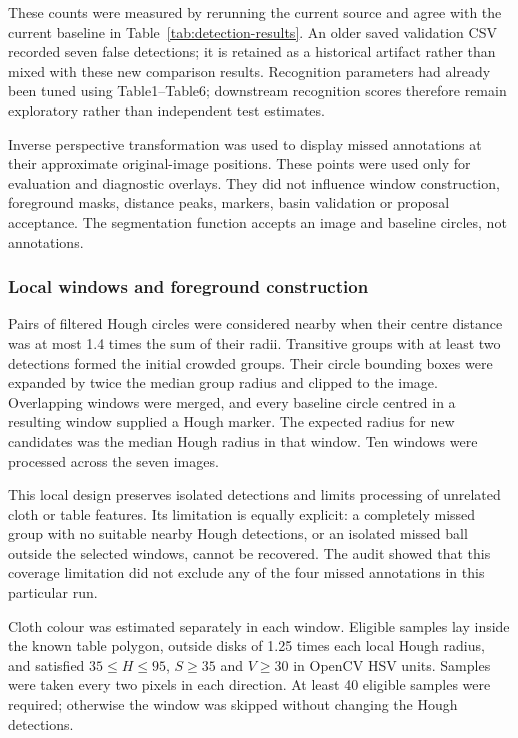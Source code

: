 These counts were measured by rerunning the current source and agree with
the current baseline in Table~\ref{tab:detection-results}. An older saved
validation CSV recorded seven false detections; it is retained as a historical
artifact rather than mixed with these new comparison results.
Recognition parameters had already been
tuned using Table1--Table6; downstream recognition scores therefore remain
exploratory rather than independent test estimates.

Inverse perspective transformation was used to display missed annotations
at their approximate original-image positions. These points were used
only for evaluation and diagnostic overlays. They did not influence
window construction, foreground masks, distance peaks, markers, basin
validation or proposal acceptance. The segmentation function accepts an
image and baseline circles, not annotations.

\subsubsection{Local windows and foreground construction}

Pairs of filtered Hough circles were considered nearby when their centre
distance was at most 1.4 times the sum of their radii. Transitive groups
with at least two detections formed the initial crowded groups. Their
circle bounding boxes were expanded by twice the median group radius
and clipped to the image. Overlapping windows were merged, and every
baseline circle centred in a resulting window supplied a Hough marker.
The expected radius for new candidates was the median Hough radius in
that window. Ten windows were processed across the seven images.

This local design preserves isolated detections and limits processing of
unrelated cloth or table features. Its limitation is equally explicit:
a completely missed group with no suitable nearby Hough detections, or
an isolated missed ball outside the selected windows, cannot be recovered.
The audit showed that this coverage limitation did not exclude any of
the four missed annotations in this particular run.

Cloth colour was estimated separately in each window. Eligible samples
lay inside the known table polygon, outside disks of 1.25 times each
local Hough radius, and satisfied $35\leq H\leq95$, $S\geq35$ and
$V\geq30$ in OpenCV HSV units. Samples were taken every two pixels in
each direction. At least 40 eligible samples were required; otherwise
the window was skipped without changing the Hough detections.

